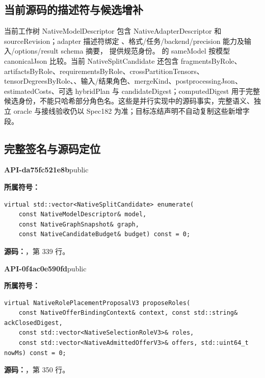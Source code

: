 \subsection{当前源码的描述符与候选增补}
当前工作树 NativeModelDescriptor 包含 NativeAdapterDescriptor 和 sourceRevision；adapter 描述符绑定 、格式/任务/backend/precision 能力及输入/options/result schema 摘要， 提供规范身份。 的 sameModel 按模型 canonicalJson 比较。当前 NativeSplitCandidate 还包含 fragmentsByRole、artifactsByRole、requirementsByRole、crossPartitionTensors、tensorDegreesByRole、、输入/结果角色、mergeKind、postprocessingJson、estimatedCosts、可选 hybridPlan 与 candidateDigest；computedDigest 用于完整候选身份，不能只哈希部分角色名。这些是并行实现中的源码事实，完整语义、独立 oracle 与接线验收仍以 Spec182 为准；目标冻结声明不自动复制这些新增字段。

\subsection{完整签名与源码定位}

\textbf{API-da75fc521e8b}\quad public\par
\textbf{所属符号：}\par
\begin{Verbatim}[fontsize=\footnotesize,breaklines,breakanywhere]
virtual std::vector<NativeSplitCandidate> enumerate(
    const NativeModelDescriptor& model,
    const NativeGraphSnapshot& graph,
    const NativeCandidateBudget& budget) const = 0;
\end{Verbatim}
\textbf{源码：}，第 339 行。\par

\textbf{API-0f4ac0e590fd}\quad public\par
\textbf{所属符号：}\par
\begin{Verbatim}[fontsize=\footnotesize,breaklines,breakanywhere]
virtual NativeRolePlacementProposalV3 proposeRoles(
    const NativeOfferBindingContext& context, const std::string& ackClosedDigest,
    const std::vector<NativeSelectionRoleV3>& roles,
    const std::vector<NativeAdmittedOfferV3>& offers, std::uint64_t nowMs) const = 0;
\end{Verbatim}
\textbf{源码：}，第 350 行。\par

